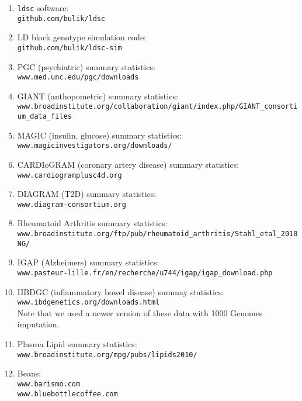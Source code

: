 \documentclass[11pt]{article}
\numberwithin{equation}{section}
\begin{document}
\begin{enumerate}
	\item \texttt{ldsc} software:\\ 
		\texttt{github.com/bulik/ldsc}
		
	\item LD block genotype simulation code:\\
		\texttt{github.com/bulik/ldsc-sim}
		
	\item PGC (psychiatric) summary statistics:\\ 
		\texttt{www.med.unc.edu/pgc/downloads}
		
	\item GIANT (anthopometric) summary statistics: \\
		\texttt{www.broadinstitute.org/collaboration/giant/index.php/GIANT\_consortium\_data\_files}
		
	\item MAGIC (insulin, glucose) summary statistics: \\
		\texttt{www.magicinvestigators.org/downloads/}
		
	\item CARDIoGRAM (coronary artery disease) summary statistics:\\	
		\texttt{www.cardiogramplusc4d.org}
	
	\item DIAGRAM (T2D) summary statistics:\\
		\texttt{www.diagram-consortium.org}
		
	\item Rheumatoid Arthritis summary statistics:\\
		\texttt{www.broadinstitute.org/ftp/pub/rheumatoid\_arthritis/Stahl\_etal\_2010NG/}
	
	\item IGAP (Alzheimers) summary statistics:\\
		\texttt{www.pasteur-lille.fr/en/recherche/u744/igap/igap\_download.php}

	\item IIBDGC (inflammatory bowel disease) summay statistics:\\
		\texttt{www.ibdgenetics.org/downloads.html}\\
		Note that we used a newer version of these data with 1000 Genomes imputation.

	\item Plasma Lipid summary statistics:\\
		\texttt{www.broadinstitute.org/mpg/pubs/lipids2010/}
	
	\item Beans:\\
		\texttt{www.barismo.com}\\
		\texttt{www.bluebottlecoffee.com}
\end{enumerate}
\end{document}
